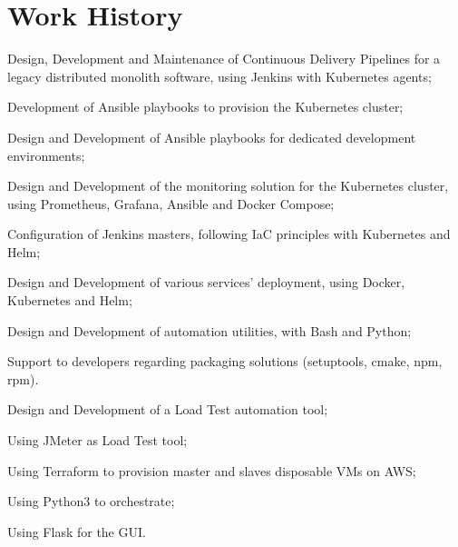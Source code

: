 \documentclass[]{deedy-resume-openfont}
\begin{document}
\begin{minipage}[t]{0.65\textwidth} 

\section{Work History}
\vspace{\topsep} %
\begin{tightemize}
	\item Design, Development and Maintenance of Continuous Delivery Pipelines for a legacy distributed monolith software, using Jenkins with Kubernetes agents;
	\item Development of Ansible playbooks to provision the Kubernetes cluster;
	\item Design and Development of Ansible playbooks for dedicated development environments;
	\item Design and Development of the monitoring solution for the Kubernetes cluster, using Prometheus, Grafana, Ansible and Docker Compose;
	\item Configuration of Jenkins masters, following IaC principles with Kubernetes and Helm;
	\item Design and Development of various services' deployment, using Docker, Kubernetes and Helm;
	\item Design and Development of automation utilities, with Bash and Python;
	\item Support to developers regarding packaging solutions (setuptools, cmake, npm, rpm).
\end{tightemize}
\sectionsep

\vspace{\topsep} %
\begin{tightemize}
	\item Design and Development of a Load Test automation tool;
	\item Using JMeter as Load Test tool;
	\item Using Terraform to provision master and slaves disposable VMs on AWS;
	\item Using Python3 to orchestrate;
	\item Using Flask for the GUI.
\end{tightemize}
\sectionsep


\end{minipage}
\end{document}
